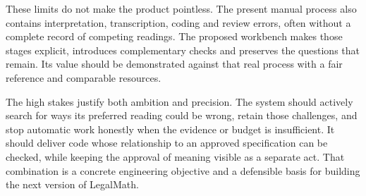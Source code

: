 
These limits do not make the product pointless. The present manual process also
contains interpretation, transcription, coding and review errors, often without a
complete record of competing readings. The proposed workbench makes those stages
explicit, introduces complementary checks and preserves the questions that remain.
Its value should be demonstrated against that real process with a fair reference
and comparable resources.

The high stakes justify both ambition and precision. The system should actively
search for ways its preferred reading could be wrong, retain those challenges,
and stop automatic work honestly when the evidence or budget is insufficient.
It should deliver code whose relationship to an approved specification can be
checked, while keeping the approval of meaning visible as a separate act.
That combination is a concrete engineering objective and a defensible basis for
building the next version of LegalMath.

